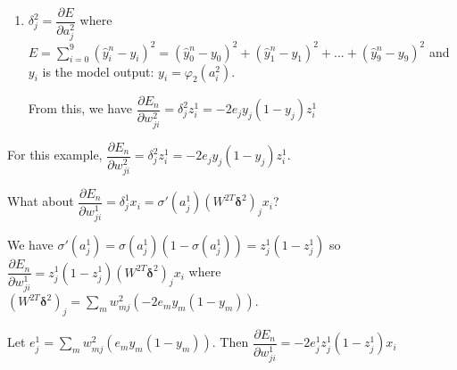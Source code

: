 \documentclass[12pt,letterpaper,noanswers]{exam}
\newcommand{\vc}[1]{\boldsymbol{#1}}
\begin{document}
\begin{enumerate}[resume=classQ]
\item $\delta_j^2 = \dfrac{\partial E}{\partial a_j^2}$ where $E = \sum\limits_{i=0}^9 (\hat{y}_i^n-y_i)^2 = (\hat{y}_0^n - y_0)^2 + (\hat{y}_1^n - y_1)^2 + ... + (\hat{y}_9^n - y_9)^2$ and $y_i$ is the model output: $y_i = \varphi_2(a_i^2)$.

From this, we have $\dfrac{\partial E_n}{\partial w_{ji}^2} = \delta_j^2 z_i^{1} = -2e_{j}y_j(1-y_j)z_i^1$

\end{enumerate}
\begin{tcolorbox}
For this example, $\dfrac{\partial E_n}{\partial w_{ji}^2} = \delta_j^2 z_i^{1} = -2e_{j}y_j(1-y_j)z_i^1$.

What about
$\dfrac{\partial E_n}{\partial w_{ji}^1} = \delta_j^1 x_i = \sigma'(a_j^1)(W^{2T}\vc{\delta}^2)_j x_i$? 

We have $\sigma'(a_j^1) = \sigma(a_j^1)(1-\sigma(a_j^1)) = z_j^1(1-z_j^1)$ so 
$\dfrac{\partial E_n}{\partial w_{ji}^1} =  z_j^1(1-z_j^1)(W^{2T}\vc{\delta}^2)_j x_i$ where $(W^{2T}\vc{\delta}^2)_j = \sum\limits_m w_{mj}^2(-2e_my_m(1-y_m))$.

Let $e_j^1 = \sum\limits_m w_{mj}^2(e_my_m(1-y_m))$.  Then $\dfrac{\partial E_n}{\partial w_{ji}^1} =  -2e^1_jz_j^1(1-z_j^1)x_i$
\end{tcolorbox}
\end{document}
